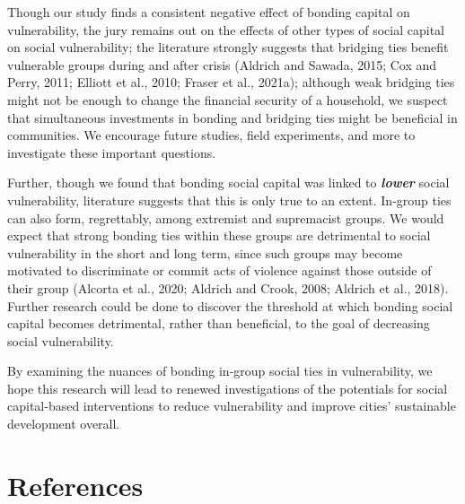 \documentclass[]{elsarticle} %
\begin{document}
Though our study finds a consistent negative effect of bonding capital
on vulnerability, the jury remains out on the effects of other types of
social capital on social vulnerability; the literature strongly suggests
that bridging ties benefit vulnerable groups during and after crisis
(Aldrich and Sawada, 2015; Cox and Perry, 2011; Elliott et al., 2010;
Fraser et al., 2021a); although weak bridging ties might not be enough
to change the financial security of a household, we suspect that
simultaneous investments in bonding and bridging ties might be
beneficial in communities. We encourage future studies, field
experiments, and more to investigate these important questions.

Further, though we found that bonding social capital was linked to
\textbf{\emph{lower}} social vulnerability, literature suggests that
this is only true to an extent. In-group ties can also form,
regrettably, among extremist and supremacist groups. We would expect
that strong bonding ties within these groups are detrimental to social
vulnerability in the short and long term, since such groups may become
motivated to discriminate or commit acts of violence against those
outside of their group (Alcorta et al., 2020; Aldrich and Crook, 2008;
Aldrich et al., 2018). Further research could be done to discover the
threshold at which bonding social capital becomes detrimental, rather
than beneficial, to the goal of decreasing social vulnerability.

By examining the nuances of bonding in-group social ties in
vulnerability, we hope this research will lead to renewed investigations
of the potentials for social capital-based interventions to reduce
vulnerability and improve cities' sustainable development overall.

\singlespacing

\hypertarget{references}{%
\section*{References}\label{references}}
\end{document}

